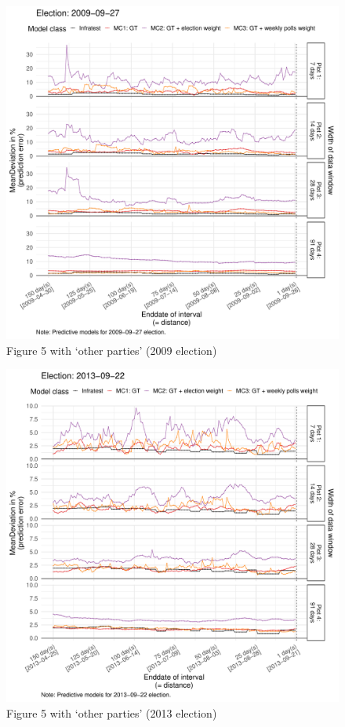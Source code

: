 \documentclass[
  letterpaper,
  DIV=11,
  numbers=noendperiod]{scrartcl}
\begin{document}
\begin{figure}[H]

\caption{\label{fig-A14}Figure 5 with `other parties' (2009 election)}

{\centering \includegraphics{figures/fig-A14-1.pdf}

}

\end{figure}

\begin{figure}[H]

\caption{\label{fig-A15}Figure 5 with `other parties' (2013 election)}

{\centering \includegraphics{figures/fig-A15-1.pdf}

}

\end{figure}
\end{document}
